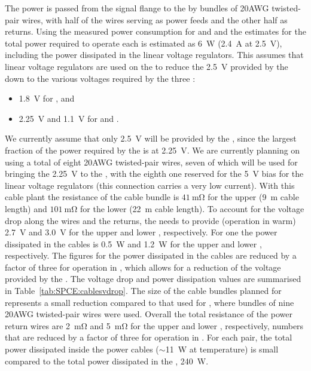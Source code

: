 The  power is passed from the signal flange to the
 by bundles of \num{20}AWG twisted-pair wires, with half of
the wires serving as power feeds and the other half as returns.
Using the measured power consumption for  and 
and the estimates for  the total power required to
operate each  is estimated as \SI{6}{W} (\SI{2.4}{A}
at \SI{2.5}{V}), including the power dissipated in the linear voltage
regulators. This assumes that linear voltage regulators are
used on the  to reduce the \SI{2.5}{V} provided by the
 down to the various voltages required by the three
:
\begin{itemize}
\item \SI{1.8}{V} for , and
\item \SI{2.25}{V} and \SI{1.1}{V} for  and .
\end{itemize}
We currently assume that only \SI{2.5}{V} will be provided by the 
, since the largest fraction of the power required by
the  is at \SI{2.25}{V}. We are currently planning on using 
a total of eight \num{20}AWG twisted-pair wires, seven of which will be used
for bringing the \SI{2.25}{V} to the , with the eighth
one reserved for the \SI{5}{V} bias for the linear voltage regulators
(this connection carries a very low current). With this cable plant the
resistance of the cable bundle is $\SI{41}{\milli\ohm}$ for the upper 
 (\SI{9}{m} cable length) and $\SI{101}{\milli\ohm}$ for
the lower  (\SI{22}{m} cable length). To account for the
voltage drop along the wires and the returns, the  needs to
provide (operation in warm) \SI{2.7}{V} and \SI{3.0}{V} for the upper
and lower , respectively. For one  the power
dissipated in the cables is \SI{0.5}{W} and \SI{1.2}{W} for the upper
and lower , respectively. The figures for the power 
dissipated in the cables are reduced by a factor of three for operation
in , which allows for a reduction of the voltage 
provided by the . The voltage drop and power dissipation
values are summarised in Table~\ref{tab:SPCE:cablesvdrop}.
The size of the cable bundles planned
for  represents a small reduction compared to that used
for , where bundles of nine \num{20}AWG twisted-pair wires
were used. Overall the total resistance of the power return wires
are \SI{2}{\milli\ohm} and \SI{5}{\milli\ohm} for the upper and
lower , respectively, numbers that are reduced by 
a factor of three for operation in . For each  pair, the total power 
dissipated inside the power cables ($\sim$\SI{11}{W} at  temperature)
is small compared to the total power dissipated in the ,
\SI{240}{W}.

